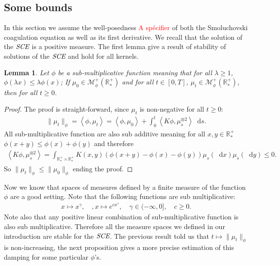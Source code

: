 \documentclass[11pt,a4paper]{article}
\newcommand{\RRP}{\mathbb{R}^+_*}
\newcommand{\MC}{\mathcal{M}}
\newcommand{\SCE}{\emph{SCE}}
\newcommand{\red}[1]{\textcolor{red}{#1}}
\newcommand{\brac}[1]{\left\langle#1\right\rangle}
\newcommand{\dd}{\mathop{}\!\mathrm{d}}
\newtheorem{lemma}[theorem]{Lemma}
\begin{document}
\subsection{Some bounds}
In this section we assume the well-posedness \red{A spécifier} of both the Smoluchovski coagulation equation as well as its first derivative. We recall that the solution of the \(\SCE\) is a positive measure. The first lemma give a result of stability of solutions of the \(\SCE\) and hold for all kernels.
\begin{lemma}\label{lem:sub-add-bounf-smol}
    Let $\phi$ be a sub-multiplicative function meaning that for all $\lambda \geq 1$, $\phi(\lambda x) \leq \lambda \phi(x)$; If $\mu_0 \in \MC^+_{\phi}(\RRP)$ and for all $t\in[0,T]$, $\mu_t \in \MC^+_{\phi}(\RRP)$, then for all $t\geq 0$.
\end{lemma}
\begin{proof}
    The proof is straight-forward, since $\mu_t$ is non-negative for all $t\geq 0$:
    \begin{align*}
        \|\mu_t\|_{\phi} = \brac{\phi,\mu_t} = \brac{\phi,\mu_0} + \int_0^t \brac{K\phi,\mu_s^{\otimes 2}}\dd s.
    \end{align*}
    All sub-multiplicative function are also sub additive meaning for all $x,y \in \RRP$ \(\phi(x+y) \leq \phi(x) + \phi(y)\) and therefore
    \begin{align*}
        \brac{K\phi,\mu_s^{\otimes 2}} = \int_{\RRP\times \RRP} K(x,y) \left(\phi(x+y) - \phi(x) - \phi(y)\right) \mu_s(\dd x) \mu_s (\dd y) \leq 0.
    \end{align*}
    So $ \|\mu_t\|_{\phi} \leq  \|\mu_0\|_{\phi}$ ending the proof.
\end{proof}
Now we know that spaces of measures defined by a finite measure of the function $\phi$ are a good setting. Note that the following functions are sub multiplicative:
\begin{align*}
    x \mapsto x^\gamma,\quad,x \mapsto e^{cx^\gamma},\quad  \gamma\in(-\infty,0], \quad c \geq 0. 
\end{align*}
Note also that any positive linear combination of sub-multiplicative function is also sub multiplicative. Therefore all the measure spaces we defined in our introduction are stable for the $\SCE$. The previous result told us that $t \mapsto \|\mu_t\|_{\phi}$ is non-increasing, the next proposition gives a more precise estimation of this damping for some particular $\phi$'s. 
\end{document}
